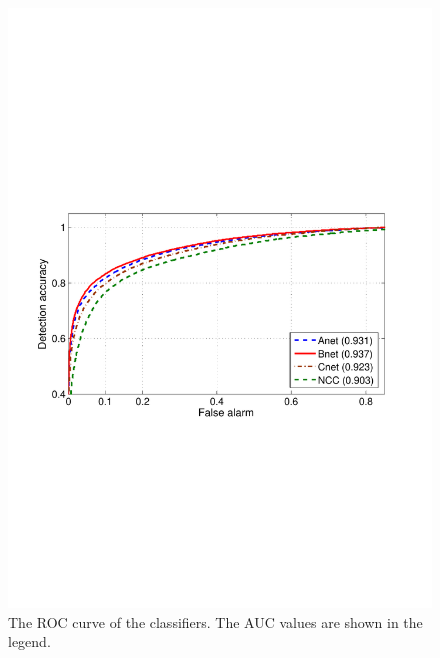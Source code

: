 \documentclass[a4paper]{article}
\begin{document}
\begin{figure}[t]
  \centering
  \includegraphics[width=0.95\linewidth]{fig4_roc.pdf}
  \caption{The ROC curve of the classifiers. The AUC values are shown in the legend.}
  \label{fig4}
\end{figure}
\end{document}
